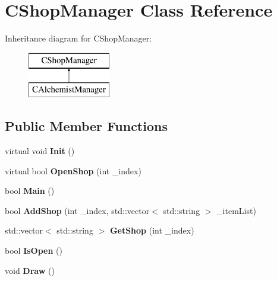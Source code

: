 \hypertarget{class_c_shop_manager}{}\section{C\+Shop\+Manager Class Reference}
\label{class_c_shop_manager}
Inheritance diagram for C\+Shop\+Manager\+:\begin{figure}[H]
\begin{center}
\leavevmode
\includegraphics[height=2.000000cm]{class_c_shop_manager}
\end{center}
\end{figure}
\subsection*{Public Member Functions}
\begin{DoxyCompactItemize}
\item 
virtual void {\bfseries Init} ()\hypertarget{class_c_shop_manager_ac9b4db61b164eeb2d1179ba25c8b789e}{}\label{class_c_shop_manager_ac9b4db61b164eeb2d1179ba25c8b789e}

\item 
virtual bool {\bfseries Open\+Shop} (int \+\_\+index)\hypertarget{class_c_shop_manager_a5eed1bcf7e2f3682233a9409410bb4d8}{}\label{class_c_shop_manager_a5eed1bcf7e2f3682233a9409410bb4d8}

\item 
bool {\bfseries Main} ()\hypertarget{class_c_shop_manager_a9bad8f0e9744a624d7afece9f89521fc}{}\label{class_c_shop_manager_a9bad8f0e9744a624d7afece9f89521fc}

\item 
bool {\bfseries Add\+Shop} (int \+\_\+index, std\+::vector$<$ std\+::string $>$ \+\_\+item\+List)\hypertarget{class_c_shop_manager_aa6d2584f142db1ab60d84a96c3d0a06c}{}\label{class_c_shop_manager_aa6d2584f142db1ab60d84a96c3d0a06c}

\item 
std\+::vector$<$ std\+::string $>$ {\bfseries Get\+Shop} (int \+\_\+index)\hypertarget{class_c_shop_manager_a54ca0cef8d7ae6fe90f174f42b9d2846}{}\label{class_c_shop_manager_a54ca0cef8d7ae6fe90f174f42b9d2846}

\item 
bool {\bfseries Is\+Open} ()\hypertarget{class_c_shop_manager_ac6abebd722efe82d578ff6d72879628d}{}\label{class_c_shop_manager_ac6abebd722efe82d578ff6d72879628d}

\item 
void {\bfseries Draw} ()\hypertarget{class_c_shop_manager_ab64860e553b73fc75f6585aeb77b57f3}{}\label{class_c_shop_manager_ab64860e553b73fc75f6585aeb77b57f3}

\end{DoxyCompactItemize}

